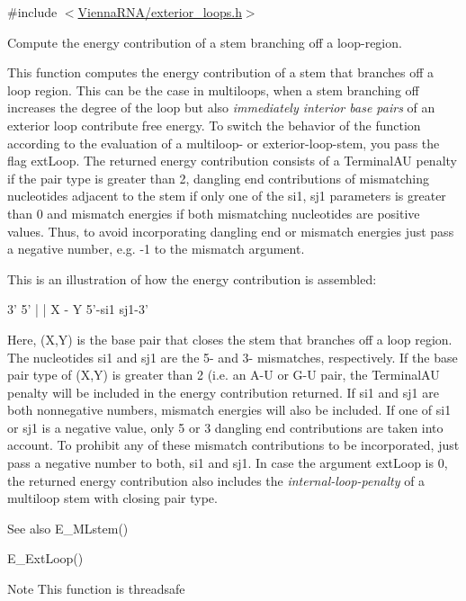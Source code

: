 {\ttfamily \#include $<$\hyperlink{exterior__loops_8h}{Vienna\+R\+N\+A/exterior\+\_\+loops.\+h}$>$}



Compute the energy contribution of a stem branching off a loop-\/region. 

This function computes the energy contribution of a stem that branches off a loop region. This can be the case in multiloops, when a stem branching off increases the degree of the loop but also {\itshape immediately interior base pairs} of an exterior loop contribute free energy. To switch the behavior of the function according to the evaluation of a multiloop-\/ or exterior-\/loop-\/stem, you pass the flag \textquotesingle{}ext\+Loop\textquotesingle{}. The returned energy contribution consists of a Terminal\+AU penalty if the pair type is greater than 2, dangling end contributions of mismatching nucleotides adjacent to the stem if only one of the si1, sj1 parameters is greater than 0 and mismatch energies if both mismatching nucleotides are positive values. Thus, to avoid incorporating dangling end or mismatch energies just pass a negative number, e.\+g. -\/1 to the mismatch argument.

This is an illustration of how the energy contribution is assembled\+: 
\begin{DoxyPre}
      3'  5'
      |   |
      X - Y
5'-si1     sj1-3'
\end{DoxyPre}


Here, (X,Y) is the base pair that closes the stem that branches off a loop region. The nucleotides si1 and sj1 are the 5\textquotesingle{}-\/ and 3\textquotesingle{}-\/ mismatches, respectively. If the base pair type of (X,Y) is greater than 2 (i.\+e. an A-\/U or G-\/U pair, the Terminal\+AU penalty will be included in the energy contribution returned. If si1 and sj1 are both nonnegative numbers, mismatch energies will also be included. If one of si1 or sj1 is a negative value, only 5\textquotesingle{} or 3\textquotesingle{} dangling end contributions are taken into account. To prohibit any of these mismatch contributions to be incorporated, just pass a negative number to both, si1 and sj1. In case the argument ext\+Loop is 0, the returned energy contribution also includes the {\itshape internal-\/loop-\/penalty} of a multiloop stem with closing pair type.

\begin{DoxySeeAlso}{See also}
E\+\_\+\+M\+Lstem() 

E\+\_\+\+Ext\+Loop() 
\end{DoxySeeAlso}
\begin{DoxyNote}{Note}
This function is threadsafe
\end{DoxyNote}

